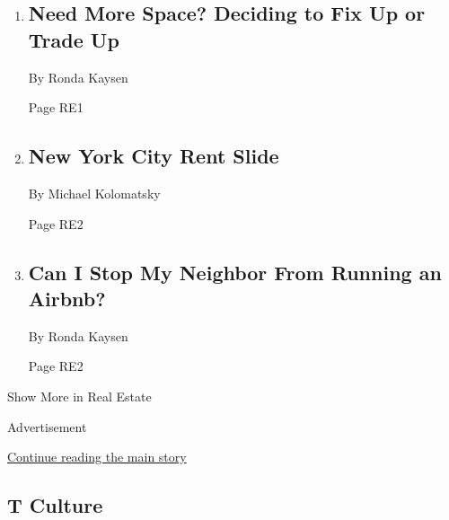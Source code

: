 \begin{enumerate}
\def\labelenumi{\arabic{enumi}.}
\item
  \href{/2018/04/20/realestate/need-more-space-deciding-to-fix-up-or-trade-up.html}{}

  \hypertarget{need-more-space-deciding-to-fix-up-or-trade-up}{%
  \subsection{Need More Space? Deciding to Fix Up or Trade
  Up}\label{need-more-space-deciding-to-fix-up-or-trade-up}}

  By Ronda Kaysen

  Page RE1
\item
  \href{/2018/04/19/realestate/new-york-city-rent-slide.html}{}

  \hypertarget{new-york-city-rent-slide}{%
  \subsection{New York City Rent Slide}\label{new-york-city-rent-slide}}

  By Michael Kolomatsky

  Page RE2
\item
  \href{/2018/04/21/realestate/can-i-stop-my-neighbor-from-running-an-airbnb.html}{}

  \hypertarget{can-i-stop-my-neighbor-from-running-an-airbnb}{%
  \subsection{Can I Stop My Neighbor From Running an
  Airbnb?}\label{can-i-stop-my-neighbor-from-running-an-airbnb}}

  By Ronda Kaysen

  Page RE2
\end{enumerate}

Show More in Real Estate

Advertisement

\protect\hyperlink{after-mid8}{Continue reading the main story}

\hypertarget{t-culture}{%
\subsection{T Culture}\label{t-culture}}

